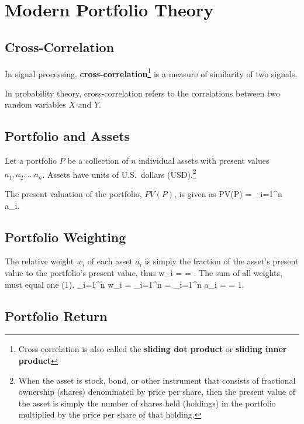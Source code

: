 \chapter{Modern Portfolio Theory}

\section{Cross-Correlation}
In signal processing, {\bf cross-correlation}\footnote{Cross-correlation is
also called the {\bf sliding dot product} or {\bf sliding inner product}}
is a measure of similarity of two signals.  

In probability theory, cross-correlation refers to the correlations between
two random variables $X$ and $Y$.


\section{Portfolio and Assets}

Let a portfolio $P$ be a collection of $n$ individual assets 
with present values $a_1, a_2, \ldots a_n$.
Assets have units of 
U.S.~dollars (USD).\footnote{When the asset is stock, bond, or 
other instrument that consists of 
fractional ownership (shares) denominated by price per share, 
then the present value of the asset is simply the number of shares
held (holdings) in the portfolio multiplied by the price per share of that
holding.}

The present valuation of the portfolio, $PV(P)$, is given as
\be
 PV(P) = \sum_{i=1}^n a_i.
\ee

\section{Portfolio Weighting}

The relative weight $w_i$ of each asset $a_i$ is simply the fraction 
of the asset's present value to the portfolio's present value, thus
\be
 w_i =  = .
\ee
The sum of all weights, must equal one (1).
\be
 \sum_{i=1}^n w_i = \sum_{i=1}^n  =  \sum_{i=1}^n a_i 
 =  = 1.
\ee

\section{Portfolio Return}

